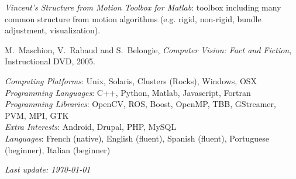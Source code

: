 \begin{llist}
{\em Vincent's Structure from Motion Toolbox for Matlab}: toolbox including many common structure from motion algorithms (e.g. rigid, non-rigid, bundle adjustment, visualization).

M.~Maschion, V.~Rabaud and S.~Belongie, {\em Computer Vision: Fact and Fiction},
Instructional DVD, 2005.

{\em Computing Platforms}: Unix, Solaris, Clusters (Rocks), Windows, OSX\\
{\em Programming Languages}: C++, Python, Matlab, Javascript, Fortran \\
{\em Programming Libraries}: OpenCV, ROS, Boost, OpenMP, TBB, GStreamer, PVM, MPI, GTK \\
{\em Extra Interests}: Android, Drupal, PHP, MySQL \\
{\em Languages}: French (native), English (fluent), Spanish (fluent), Portuguese (beginner), Italian (beginner)





\end{llist}

{\em Last update: \today}


